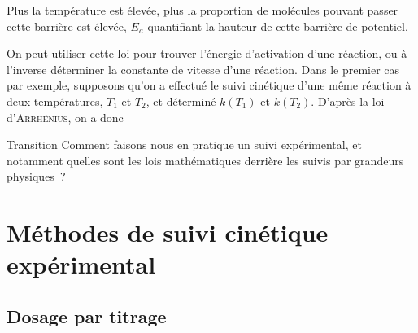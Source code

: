 \documentclass[../main/main.tex]{subfiles}
\begin{document}
\medskip
Plus la température est élevée, plus la proportion de molécules pouvant passer
cette barrière est élevée, $E_a$ quantifiant la hauteur de cette barrière de
potentiel.\bigbreak

On peut utiliser cette loi pour trouver l'énergie d'activation d'une réaction,
ou à l'inverse déterminer la constante de vitesse d'une réaction. Dans le
premier cas par exemple, supposons qu'on a effectué le suivi cinétique d'une
même réaction à deux températures, $T_1$ et $T_2$, et déterminé $k(T_1)$ et
$k(T_2)$. D'après la loi d'\textsc{Arrhénius}, on a donc

\begin{instruc}[trans]{Transition}
    Comment faisons nous en pratique un suivi expérimental, et notamment quelles
    sont les lois mathématiques derrière les suivis par grandeurs physiques~?
\end{instruc}

\section{Méthodes de suivi cinétique expérimental}
\subsection{Dosage par titrage}
\end{document}
